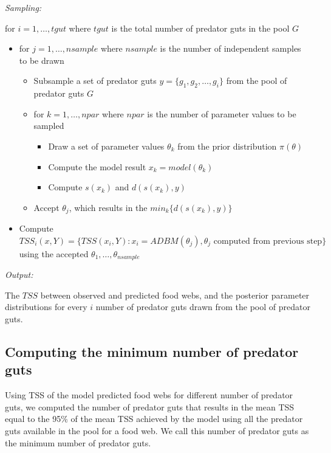 \documentclass{article}
\begin{document}
\emph{Sampling:}

for \(i = 1, \dots, tgut\) where \(tgut\) is the total number of
predator guts in the pool \(G\)

\begin{itemize}
\item
  for \(j = 1, \dots, nsample\) where \(nsample\) is the number of
  independent samples to be drawn

  \begin{itemize}
  \item
    Subsample a set of predator guts \(y = \{g_1, g_2, \dots, g_i\}\)
    from the pool of predator guts \(G\)
  \item
    for \(k = 1, \dots, npar\) where \(npar\) is the number of parameter
    values to be sampled

    \begin{itemize}
    \item
      Draw a set of parameter values \(\theta_k\) from the prior
      distribution \(\pi(\theta)\)
    \item
      Compute the model result \(x_k = model(\theta_k)\)
    \item
      Compute \(s(x_k)\) and \(d(s(x_k), y)\)
    \end{itemize}
  \item
    Accept \(\theta_j\), which results in the \(min_k\{d(s(x_k), y)\}\)
  \end{itemize}
\item
  Compute
  \(TSS_{i}(x, Y) = \{TSS(x_i, Y): x_i = ADBM(\theta_j), \theta_j \text{ computed from previous step}\}\)
  using the accepted \(\theta_1, \dots, \theta_{nsample}\)
\end{itemize}

\emph{Output:}

The \(TSS\) between observed and predicted food webs, and the posterior
parameter distributions for every \(i\) number of predator guts drawn
from the pool of predator guts.

\hypertarget{computing-the-minimum-number-of-predator-guts}{%
\subsection{Computing the minimum number of predator
guts}\label{computing-the-minimum-number-of-predator-guts}}

Using TSS of the model predicted food webs for different number of
predator guts, we computed the number of predator guts that results in
the mean TSS equal to the 95\% of the mean TSS achieved by the model
using all the predator guts available in the pool for a food web. We
call this number of predator guts as the minimum number of predator
guts.
\end{document}
